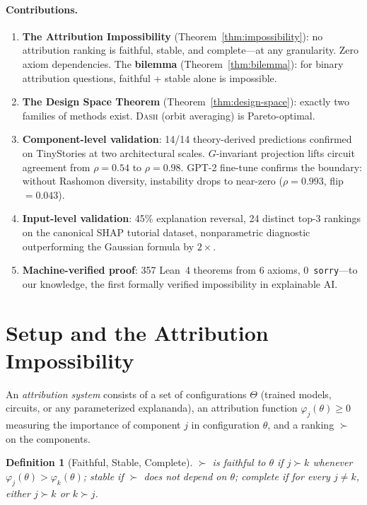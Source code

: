 \documentclass{article}
\newtheorem{definition}[theorem]{Definition}
\newcommand{\DASH}{\textsc{Dash}}
\begin{document}
\paragraph{Contributions.}
\begin{enumerate}
    \item \textbf{The Attribution Impossibility} (Theorem~\ref{thm:impossibility}): no attribution ranking is faithful, stable, and complete---at any granularity. Zero axiom dependencies. The \textbf{bilemma} (Theorem~\ref{thm:bilemma}): for binary attribution questions, faithful + stable alone is impossible.
    \item \textbf{The Design Space Theorem} (Theorem~\ref{thm:design-space}): exactly two families of methods exist. \DASH{} (orbit averaging) is Pareto-optimal.
    \item \textbf{Component-level validation}: 14/14 theory-derived predictions confirmed on TinyStories at two architectural scales. $G$-invariant projection lifts circuit agreement from $\rho{=}0.54$ to $\rho{=}0.98$. GPT-2 fine-tune confirms the boundary: without Rashomon diversity, instability drops to near-zero ($\rho{=}0.993$, flip $= 0.043$).
    \item \textbf{Input-level validation}: 45\% explanation reversal, 24 distinct top-3 rankings on the canonical SHAP tutorial dataset, nonparametric diagnostic outperforming the Gaussian formula by $2\times$.
    \item \textbf{Machine-verified proof}: 357 Lean~4 theorems from 6 axioms, 0~\texttt{sorry}---to our knowledge, the first formally verified impossibility in explainable AI.
\end{enumerate}

\section{Setup and the Attribution Impossibility}
\label{sec:setup}

An \emph{attribution system} consists of a set of configurations $\Theta$ (trained models, circuits, or any parameterized explananda), an attribution function $\varphi_j(\theta) \geq 0$ measuring the importance of component $j$ in configuration $\theta$, and a ranking $\succ$ on the components.

\begin{definition}[Faithful, Stable, Complete]
\label{def:desiderata}
$\succ$ is \emph{faithful} to $\theta$ if $j \succ k$ whenever $\varphi_j(\theta) > \varphi_k(\theta)$;
\emph{stable} if $\succ$ does not depend on $\theta$;
\emph{complete} if for every $j \neq k$, either $j \succ k$ or $k \succ j$.
\end{definition}
\end{document}
